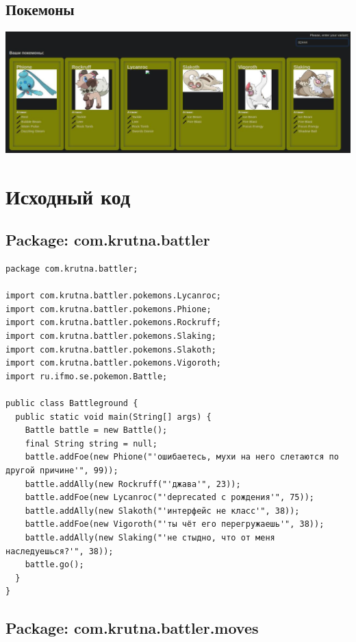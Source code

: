 \documentclass[11pt]{article}
\begin{document}
\subsection{Покемоны}
\label{sec:orgae59553}
\begin{center}
\includegraphics[width=.9\linewidth]{pokemons.jpg}
\end{center}

\section{Исходный код}
\label{sec:org38997be}
\subsection{Package: com.krutna.battler}
\label{sec:orgb7442f7}
\begin{lstlisting}
package com.krutna.battler;

import com.krutna.battler.pokemons.Lycanroc;
import com.krutna.battler.pokemons.Phione;
import com.krutna.battler.pokemons.Rockruff;
import com.krutna.battler.pokemons.Slaking;
import com.krutna.battler.pokemons.Slakoth;
import com.krutna.battler.pokemons.Vigoroth;
import ru.ifmo.se.pokemon.Battle;

public class Battleground {
  public static void main(String[] args) {
    Battle battle = new Battle();
    final String string = null;
    battle.addFoe(new Phione("'ошибаетесь, мухи на него слетаются по другой причине'", 99));
    battle.addAlly(new Rockruff("'джава'", 23));
    battle.addFoe(new Lycanroc("'deprecated с рождения'", 75));
    battle.addAlly(new Slakoth("'интерфейс не класс'", 38));
    battle.addFoe(new Vigoroth("'ты чёт его перегружаешь'", 38));
    battle.addAlly(new Slaking("'не стыдно, что от меня наследуешься?'", 38));
    battle.go();
  }
}
\end{lstlisting}

\subsection{Package: com.krutna.battler.moves}
\label{sec:orgcfd31db}
\end{document}
